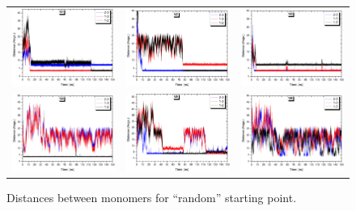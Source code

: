 \begin{figure}[htb]
	\centering
	\begin{tabular}{ccc}
		\includegraphics[width=0.3\columnwidth]{image/distance_M1} &
		\includegraphics[width=0.3\columnwidth]{image/distance_M2} &
		\includegraphics[width=0.3\columnwidth]{image/distance_M3} \\
		\includegraphics[width=0.3\columnwidth]{image/distance_M4} &
		\includegraphics[width=0.3\columnwidth]{image/distance_M5} &
		\includegraphics[width=0.3\columnwidth]{image/distance_M6} \\
	\end{tabular}
	\caption{Distances between monomers for ``random'' starting point.}
	\label{pap:fig13}
\end{figure}


